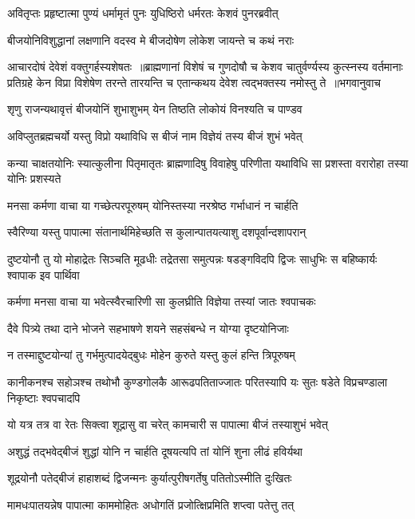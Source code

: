 \twolineshloka
{अवितृप्तः प्रहृष्टात्मा पुण्यं धर्मामृतं पुनः}
{युधिष्ठिरो धर्मरतः केशवं पुनरब्रवीत्}


\twolineshloka
{बीजयोनिविशुद्धानां लक्षणानि वदस्व मे}
{बीजदोषेण लोकेश जायन्ते च कथं नराः}


आचारदोषं देवेशं वक्तुगर्हस्यशेषतः ॥ब्राह्मणानां विशेषं च गुणदोषौ च केशव
\fourlineindentedshloka
{चातुर्वर्ण्यस्य कुत्स्नस्य वर्तमानाः प्रतिग्रहे}
{केन विप्रा विशेषेण तरन्ते तारयन्ति च}
{एतान्कथय देवेश त्वद्भक्तस्य नमोस्तु ते ॥भगवानुवाच}
{}


\twolineshloka
{शृणु राजन्यथावृत्तं बीजयोनिं शुभाशुभम्}
{येन तिष्ठति लोकोयं विनश्यति च पाण्डव}


\twolineshloka
{अविप्लुतब्रह्मचर्यो यस्तु विप्रो यथाविधि}
{स बीजं नाम विज्ञेयं तस्य बीजं शुभं भवेत्}


\threelineshloka
{कन्या चाक्षतयोनिः स्यात्कुलीना पितृमातृतः}
{ब्राह्मणादिषु विवाहेषु परिणीता यथाविधि}
{सा प्रशस्ता वरारोहा तस्या योनिः प्रशस्यते}


\twolineshloka
{मनसा कर्मणा वाचा या गच्छेत्परपूरुषम्}
{योनिस्तस्या नरश्रेष्ठ गर्भाधानं न चार्हति}


\twolineshloka
{स्वैरिण्या यस्तु पापात्मा संतानार्थमिहेच्छति}
{स कुलान्पातयत्याशु दशपूर्वान्दशापरान्}


\threelineshloka
{दुष्टयोनौ तु यो मोहाद्रेतः सिञ्चति मूढधीः}
{तद्रेतसा समुत्पन्नः षडङ्गविदपि द्विजः}
{साधुभिः स बहिष्कार्यः श्वापाक इव पार्थिवा}


\twolineshloka
{कर्मणा मनसा वाचा या भवेत्स्वैरचारिणी}
{सा कुलघ्रीति विज्ञेया तस्यां जातः श्वपाचकः}


\twolineshloka
{दैवे पित्र्ये तथा दाने भोजने सहभाषणे}
{शयने सहसंबन्धे न योग्या दृष्टयोनिजाः}


\twolineshloka
{न तस्माद्दुष्टयोन्यां तु गर्भमुत्पादयेद्बुधः}
{मोहेन कुरुते यस्तु कुलं हन्ति त्रिपूरुषम्}


\threelineshloka
{कानीकनश्च सहोञश्च तथोभौ कुण्डगोलकै}
{आरूढपतिताज्जातः परितस्यापि यः सुतः}
{षडेते विप्रचण्डाला निकृष्टाः श्वपचादपि}


\twolineshloka
{यो यत्र तत्र वा रेतः सिक्त्वा शूद्रासु वा चरेत्}
{कामचारी स पापात्मा बीजं तस्याशुभं भवेत्}


\twolineshloka
{अशुद्धं तद्भवेद्बीजं शुद्धां योनि न चार्हति}
{दूषयत्यपि तां योनिं शुना लीढं हविर्यथा}


\twolineshloka
{शूद्रयोनौ पतेद्बीजं हाहाशब्दं द्विजन्मनः}
{कुर्यात्पुरीषगर्तेषु पतितोऽस्मीति दुःखितः}


\twolineshloka
{मामधःपातयन्नेष पापात्मा काममोहितः}
{अधोगतिं प्रजोत्क्षिप्रमिति शप्त्वा पतेत्तु तत्}


